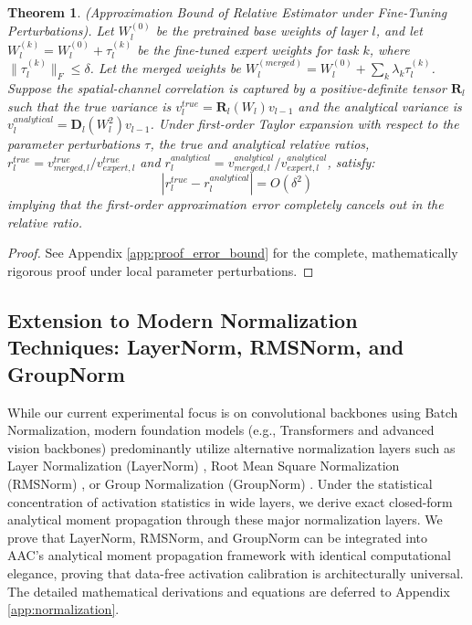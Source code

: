 \documentclass{article}
\theoremstyle{plain}
\newtheorem{theorem}{Theorem}[section]
\theoremstyle{definition}
\theoremstyle{remark}
\begin{document}
\begin{theorem}
\label{thm:error_bound}
(Approximation Bound of Relative Estimator under Fine-Tuning Perturbations).
Let $W_l^{(0)}$ be the pretrained base weights of layer $l$, and let $W_l^{(k)} = W_l^{(0)} + \tau_l^{(k)}$ be the fine-tuned expert weights for task $k$, where $\|\tau_l^{(k)}\|_F \le \delta$. Let the merged weights be $W_l^{(merged)} = W_l^{(0)} + \sum_k \lambda_k \tau_l^{(k)}$. Suppose the spatial-channel correlation is captured by a positive-definite tensor $\mathbf{R}_l$ such that the true variance is $v^{true}_l = \mathbf{R}_l(W_l) v_{l-1}$ and the analytical variance is $v^{analytical}_l = \mathbf{D}_l(W_l^2) v_{l-1}$. Under first-order Taylor expansion with respect to the parameter perturbations $\tau$, the true and analytical relative ratios, $r^{true}_l = v^{true}_{merged, l}/v^{true}_{expert, l}$ and $r^{analytical}_l = v^{analytical}_{merged, l}/v^{analytical}_{expert, l}$, satisfy:
\begin{equation}
    \left| r^{true}_l - r^{analytical}_l \right| = O(\delta^2)
\end{equation}
implying that the first-order approximation error completely cancels out in the relative ratio.
\end{theorem}

\begin{proof}
See Appendix \ref{app:proof_error_bound} for the complete, mathematically rigorous proof under local parameter perturbations.
\end{proof}

\subsection{Extension to Modern Normalization Techniques: LayerNorm, RMSNorm, and GroupNorm}
\label{sec:normalization}

While our current experimental focus is on convolutional backbones using Batch Normalization, modern foundation models (e.g., Transformers and advanced vision backbones) predominantly utilize alternative normalization layers such as Layer Normalization (LayerNorm) \cite{ba2016layer}, Root Mean Square Normalization (RMSNorm) \cite{zhang2019rmsnorm}, or Group Normalization (GroupNorm) \cite{wu2018group}. Under the statistical concentration of activation statistics in wide layers, we derive exact closed-form analytical moment propagation through these major normalization layers. We prove that LayerNorm, RMSNorm, and GroupNorm can be integrated into AAC's analytical moment propagation framework with identical computational elegance, proving that data-free activation calibration is architecturally universal. The detailed mathematical derivations and equations are deferred to Appendix \ref{app:normalization}.
\end{document}
